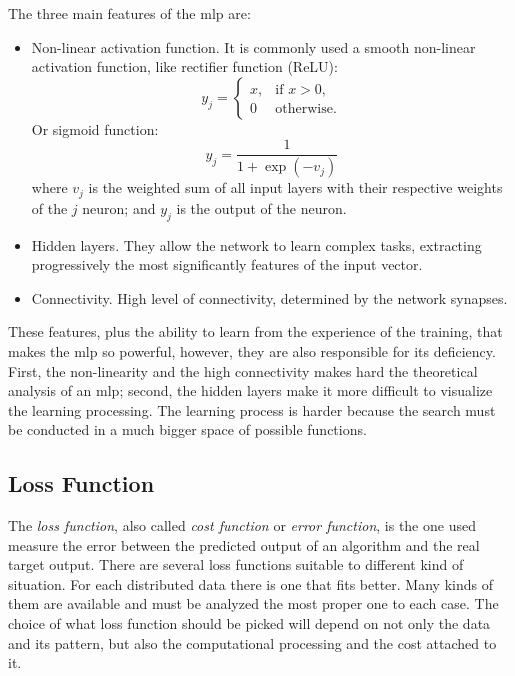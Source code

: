 The three main features of the \gls*{mlp} are:
%
\begin{itemize}
    \item Non-linear activation function. It is commonly used a smooth non-linear activation function, like rectifier function (ReLU):
    \begin{equation}
        y_j = \left\{%
        \begin{array}{ll}
            x, & \text{if } x > 0, \\
            0  & \text{otherwise.}
        \end{array} \right.
    \end{equation}
    Or sigmoid function:
    \begin{equation}
        y_j = \frac{1}{1+\exp(-v_j)}
        \label{eq:sigmoid_function}
    \end{equation}
    where \(v_j\) is the weighted sum of all input layers with their respective weights of the \(j\) neuron; and \(y_j\) is the output of the neuron.
    \item Hidden layers. They allow the network to learn complex tasks, extracting progressively the most significantly features of the input vector.
    \item Connectivity. High level of connectivity, determined by the network synapses.
\end{itemize}

These features, plus the ability to learn from the experience of the training, that makes the \gls*{mlp} so powerful, however, they are also responsible for its deficiency. 
First, the non-linearity and the high connectivity makes hard the theoretical analysis of an \gls*{mlp}; second, the hidden layers make it more difficult to visualize the learning processing. 
The learning process is harder because the search must be conducted in a much bigger space of possible functions.

\subsection{Loss Function}\label{sec:loss_function}

The \emph{loss function}, also called \emph{cost function} or \emph{error function}, is the one used measure the error between the predicted output of an algorithm and the real target output. 
There are several loss functions suitable to different kind of situation. 
For each distributed data there is one that fits better.
Many kinds of them are available and must be analyzed the most proper one to each case. 
The choice of what loss function should be picked will depend on not only the data and its pattern, but also the computational processing and the cost attached to it.

